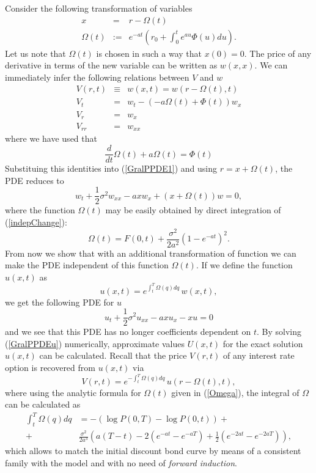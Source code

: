 Consider the following transformation of variables
\begin{eqnarray}
\label{indepChange}
\nonumber
x & = & r - \Omega(t) \\
\Omega(t) & := & e^{-a t} \left( r_0 + \int^t_0 e^{a u} \Phi(u) du \right).
\end{eqnarray}
Let us note that $\Omega(t)$ is chosen in such a way that $x(0)=0$.
 The price of any derivative in terms of the new variable can be
 written as $w(x,x)$. We can immediately infer the following relations
 between $V$ and $w$ 
\begin{eqnarray}
\label{wDerivatives}
\nonumber
V(r,t) & \equiv & w(x,t) = w( r- \Omega(t), t) \\
V_t & = & w_t- \left(-a\Omega(t) + \Phi(t) \right) w_x \\
\nonumber
V_r & = & w_x\\
\nonumber
V_{rr} & = & w_{xx}
\end{eqnarray}
where we have used that
$$
\frac{d}{dt} \Omega(t)+a \Omega(t)=\Phi(t)
$$
Substituing this identities into (\ref{GralPPDE1}) and using $ r =
x+\Omega(t)$, the PDE reduces to 
$$
w_t+ \frac{1}{2} \sigma^2 w_{xx} - a x w_x + \left(x+\Omega(t) \right)w
= 0,
$$
where the function $\Omega(t)$ may be easily obtained by direct integration
of (\ref{indepChange}):
\begin{equation}
\label{Omega}
\Omega(t) = F(0,t) + \frac{\sigma^2}{2 a^2} \left( 1-e^{- a t} \right)^2.
\end{equation}
From now we show that with an additional transformation of function we
can make the PDE independent of this function $\Omega(t)$. If we
define the function $u(x, t)$ as
\begin{equation}
\label{udef}
u(x,t)=e^{\int_t^T \Omega(q) dq} \, w(x,t),
\end{equation}
we get the following PDE for $u$
\begin{equation}
\label{GralPPDEu}
u_t+\frac{1}{2} \sigma^2 u_{xx}-a x u_x - x u = 0
\end{equation}
and we see that this PDE has no longer coefficients dependent on
$t$. By solving (\ref{GralPPDEu}) numerically, approximate values
$U(x,t)$ for the exact solution $u(x,t)$ can be calculated. Recall
that the price $V(r,t)$ of any interest rate option is recovered from
$u(x,t)$ via
\begin{equation}
\label{Vfromu}
V(r,t)=e^{-\int_t^T \Omega(q) dq}\, u(r-\Omega(t), t),
\end{equation}
where using the analytic formula for $\Omega(t)$ given in
(\ref{Omega}), the integral of $\Omega$ can be calculated as
\begin{equation}
\label{IntOmega}
\begin{split}
\int_t^T \Omega(q) dq & = -\left( \log P(0,T) - \log P(0,t) \right) + \\
 + & \frac{\sigma^2}{2 a^3} \left( a(T-t) - 2 (e^{-at} - e^{-aT} ) +
  \frac{1}{2} (e^{-2 a t} - e^{-2 a T} ) \right),
\end{split}
\end{equation}
which allows to match the initial discount bond curve by means of a
consistent family with the model and with no need of {\sl forward
  induction}.
